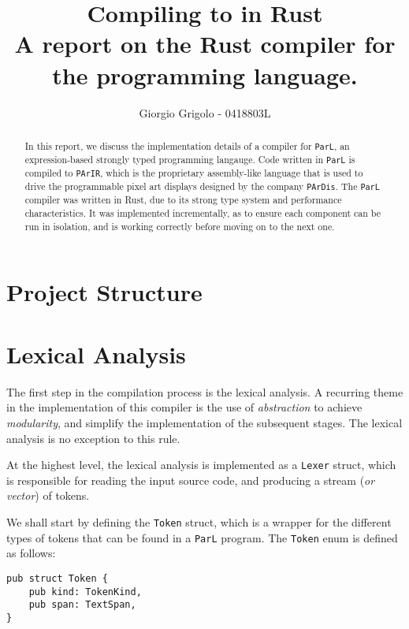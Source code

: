 \documentclass{article}
\title{Compiling \code{ParL} to \code{PArIR} in Rust \\{\normalsize A report on the Rust
compiler for the \code{ParL} programming language.}}
\author{Giorgio Grigolo - 0418803L}
\date{}
\newcommand{\code}[1]{\texttt{#1}}
\begin{document}
\maketitle
\tableofcontents

\begin{abstract}
    In this report, we discuss the implementation details of a
    compiler for \code{ParL}, an expression-based strongly typed programming
    langauge. Code written in \code{ParL} is compiled to \code{PArIR}, which is
    the proprietary assembly-like language that is used to drive the
    programmable pixel art displays designed by the company \code{PArDis}. The
    \code{ParL} compiler was written in Rust, due to its strong type system and
    performance characteristics. It was implemented incrementally, as
    to ensure each component can be run in isolation, and is working correctly
    before moving on to the next one.
\end{abstract}

\newpage

\section{Project Structure}

\newpage

\section{Lexical Analysis}

The first step in the compilation process is the lexical analysis. A recurring
theme in the implementation of this compiler is the use of \textit{abstraction}
to achieve \textit{modularity}, and simplify the implementation of the
subsequent stages. The lexical analysis is no exception to this rule.

At the highest level, the lexical analysis is implemented as a \code{Lexer}
struct, which is responsible for reading the input source code, and producing a
stream (\textit{or vector}) of tokens.

We shall start by defining the \code{Token} struct, which is a wrapper for the
different types of tokens that can be found in a \code{ParL} program. The
\code{Token} enum is defined as follows:

\begin{mainbox}{}
    \lstset{belowskip=0pt, aboveskip=0pt}
    \begin{lstlisting}
pub struct Token {
    pub kind: TokenKind,
    pub span: TextSpan,
}
    \end{lstlisting}
\end{mainbox}
\end{document}
